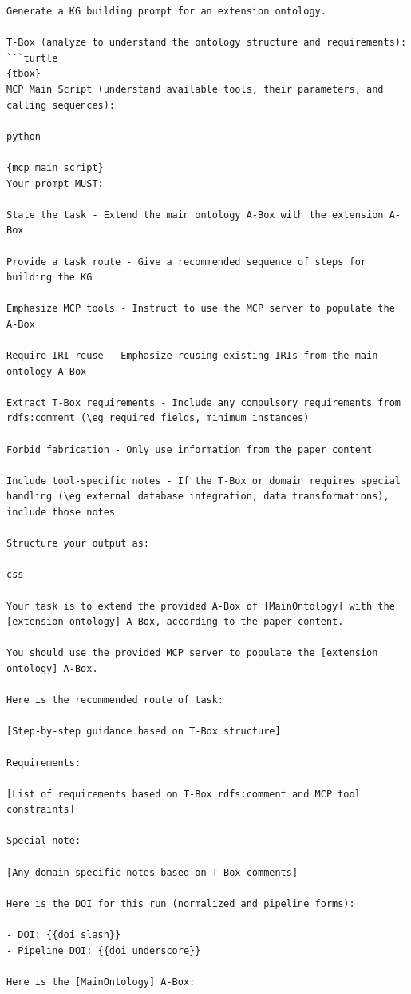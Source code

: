 \begin{lstlisting}
Generate a KG building prompt for an extension ontology.

T-Box (analyze to understand the ontology structure and requirements):
```turtle
{tbox}
MCP Main Script (understand available tools, their parameters, and calling sequences):

python
 
{mcp_main_script}
Your prompt MUST:

State the task - Extend the main ontology A-Box with the extension A-Box

Provide a task route - Give a recommended sequence of steps for building the KG

Emphasize MCP tools - Instruct to use the MCP server to populate the A-Box

Require IRI reuse - Emphasize reusing existing IRIs from the main ontology A-Box

Extract T-Box requirements - Include any compulsory requirements from rdfs:comment (\eg required fields, minimum instances)

Forbid fabrication - Only use information from the paper content

Include tool-specific notes - If the T-Box or domain requires special handling (\eg external database integration, data transformations), include those notes

Structure your output as:

css
 
Your task is to extend the provided A-Box of [MainOntology] with the [extension ontology] A-Box, according to the paper content.

You should use the provided MCP server to populate the [extension ontology] A-Box.

Here is the recommended route of task:

[Step-by-step guidance based on T-Box structure]

Requirements:

[List of requirements based on T-Box rdfs:comment and MCP tool constraints]

Special note:

[Any domain-specific notes based on T-Box comments]

Here is the DOI for this run (normalized and pipeline forms):

- DOI: {{doi_slash}}
- Pipeline DOI: {{doi_underscore}}

Here is the [MainOntology] A-Box:


\end{lstlisting}
